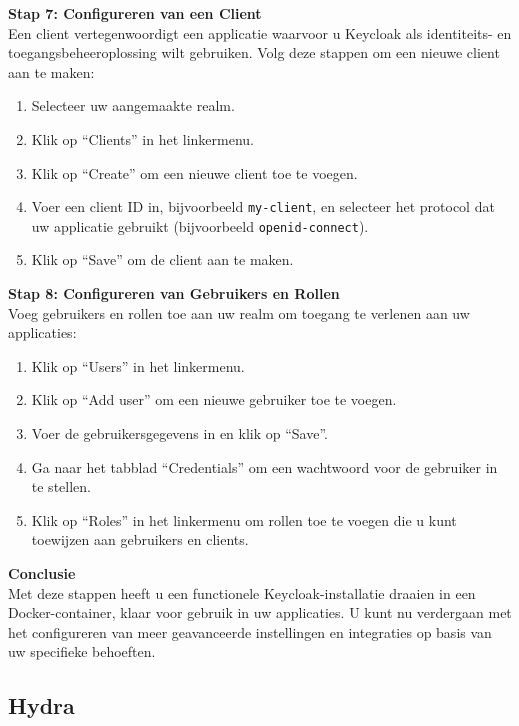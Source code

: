 \textbf{Stap 7: Configureren van een Client}\\
Een client vertegenwoordigt een applicatie waarvoor u Keycloak als identiteits- en toegangsbeheeroplossing wilt gebruiken. Volg deze stappen om een nieuwe client aan te maken:
\begin{enumerate}
    \item Selecteer uw aangemaakte realm.
    \item Klik op ``Clients'' in het linkermenu.
    \item Klik op ``Create'' om een nieuwe client toe te voegen.
    \item Voer een client ID in, bijvoorbeeld \texttt{my-client}, en selecteer het protocol dat uw applicatie gebruikt (bijvoorbeeld \texttt{openid-connect}).
    \item Klik op ``Save'' om de client aan te maken.
\end{enumerate}
\textbf{Stap 8: Configureren van Gebruikers en Rollen}\\
Voeg gebruikers en rollen toe aan uw realm om toegang te verlenen aan uw applicaties:
\begin{enumerate}
    \item Klik op ``Users'' in het linkermenu.
    \item Klik op ``Add user'' om een nieuwe gebruiker toe te voegen.
    \item Voer de gebruikersgegevens in en klik op ``Save''.
    \item Ga naar het tabblad ``Credentials'' om een wachtwoord voor de gebruiker in te stellen.
    \item Klik op ``Roles'' in het linkermenu om rollen toe te voegen die u kunt toewijzen aan gebruikers en clients.
\end{enumerate}
\textbf{Conclusie}\\
Met deze stappen heeft u een functionele Keycloak-installatie draaien in een Docker-container, klaar voor gebruik in uw applicaties. U kunt nu verdergaan met het configureren van meer geavanceerde instellingen en integraties op basis van uw specifieke behoeften.


\subsection{Hydra}%
\label{subsec:hydra}
